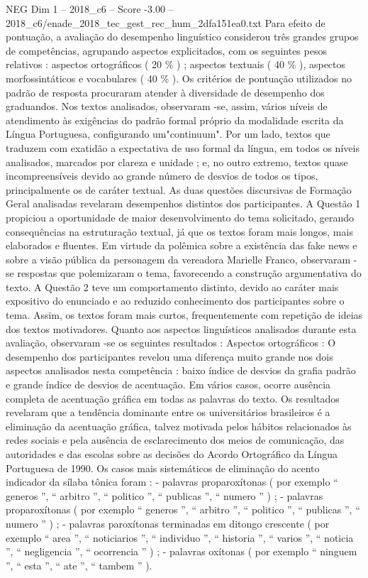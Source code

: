 \begin{textsample}{NEG Dim 1 – 2018\_c6 – Score -3.00 – 2018\_c6/enade\_2018\_tec\_gest\_rec\_hum\_2dfa151ea0.txt}
Para efeito de pontuação, a avaliação do desempenho linguístico considerou três grandes grupos de competências, agrupando aspectos explicitados, com os seguintes pesos relativos : aspectos ortográficos ( 20 \% ) ; aspectos textuais ( 40 \% ), aspectos morfossintáticos e vocabulares ( 40 \% ).
Os critérios de pontuação utilizados no padrão de resposta procuraram atender à diversidade de desempenho dos graduandos.
Nos textos analisados, observaram -se, assim, vários níveis de atendimento às exigências do padrão formal próprio da modalidade escrita da Língua Portuguesa, configurando um"continuum".
Por um lado, textos que traduzem com exatidão a expectativa de uso formal da língua, em todos os níveis analisados, marcados por clareza e unidade ; e, no outro extremo, textos quase incompreensíveis devido ao grande número de desvios de todos os tipos, principalmente os de caráter textual.
As duas questões discursivas de Formação Geral analisadas revelaram desempenhos distintos dos participantes.
A Questão 1 propiciou a oportunidade de maior desenvolvimento do tema solicitado, gerando consequências na estruturação textual, já que os textos foram mais longos, mais elaborados e fluentes.
Em virtude da polêmica sobre a existência das fake news e sobre a visão pública da personagem da vereadora Marielle Franco, observaram -se respostas que polemizaram o tema, favorecendo a construção argumentativa do texto.
A Questão 2 teve um comportamento distinto, devido ao caráter mais expositivo do enunciado e ao reduzido conhecimento dos participantes sobre o tema.
Assim, os textos foram mais curtos, frequentemente com repetição de ideias dos textos motivadores.
Quanto aos aspectos linguísticos analisados durante esta avaliação, observaram -se os seguintes resultados : Aspectos ortográficos : O desempenho dos participantes revelou uma diferença muito grande nos dois aspectos analisados nesta competência : baixo índice de desvios da grafia padrão e grande índice de desvios de acentuação.
Em vários casos, ocorre ausência completa de acentuação gráfica em todas as palavras do texto.
Os resultados revelaram que a tendência dominante entre os universitários brasileiros é a eliminação da acentuação gráfica, talvez motivada pelos hábitos relacionados às redes sociais e pela ausência de esclarecimento dos meios de comunicação, das autoridades e das escolas sobre as decisões do Acordo Ortográfico da Língua Portuguesa de 1990.
Os casos mais sistemáticos de eliminação do acento indicador da sílaba tônica foram : - palavras proparoxítonas ( por exemplo “ generos ”, “ arbitro ”, “ politico ”, “ publicas ”, “ numero ” ) ; - palavras proparoxítonas ( por exemplo “ generos ”, “ arbitro ”, “ politico ”, “ publicas ”, “ numero ” ) ; - palavras paroxítonas terminadas em ditongo crescente ( por exemplo “ area ”, “ noticiarios ”, “ individuo ”, “ historia ”, “ varios ”, “ noticia ”, “ negligencia ”, “ ocorrencia ” ) ; - palavras oxítonas ( por exemplo “ ninguem ”, “ esta ”, “ ate ”, “ tambem ” ).

\end{textsample}
